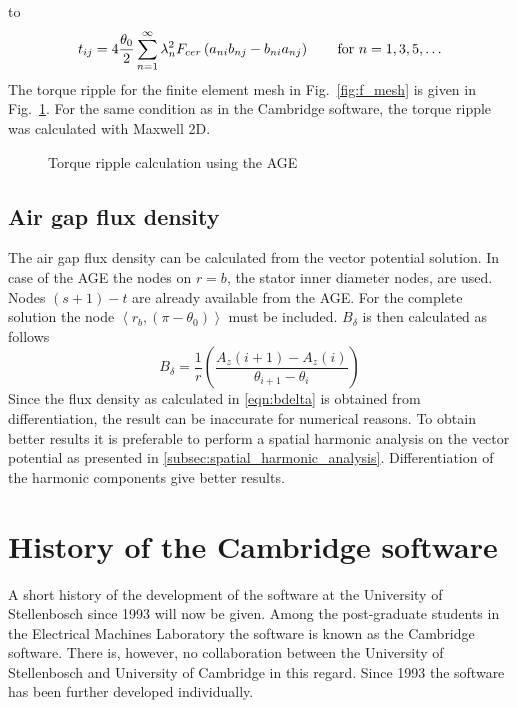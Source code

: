 to
\begin{equation}
  \label{eqn:tij_neg}
  t_{ij}=4\frac{\theta_{0}}{2}\sum^{\infty}_{n=1}\lambda^{2}_{n}
   F_{cer}\left(a_{ni}b_{nj}-b_{ni}a_{nj}\right) \qquad \textnormal{for } n=1,3,5,\ldots
\end{equation}
The torque ripple for the finite element mesh in Fig.~\ref{fig:f_mesh} is given in 
Fig.~\ref{fig:f_age_ss}. For the same condition as in the Cambridge software, the torque ripple was 
calculated with Maxwell 2D. 
\begin{figure}
    \centering
    
    \caption{Torque ripple calculation using the AGE}
    \label{fig:f_age_ss}
\end{figure}


\subsection{Air gap flux density}\label{subsec:air_gap_flux_density}
The air gap flux density can be calculated from the vector potential solution. In case of the AGE the 
nodes on $r=b$, the stator inner diameter nodes, are used. Nodes $(s+1)-t$ are already available from 
the AGE. For the complete solution the node $\left\langle r_{b},(\pi-\theta_{0})\right\rangle$ must 
be included. $B_{\delta}$ is then calculated as follows
\begin{equation}\label{eqn:bdelta}
    B_{\delta}=\frac{1}{r}
    \left(
        \frac{A_{z}(i+1)-A_{z}(i)}{\theta_{i+1}-\theta_{i}}
    \right)  
\end{equation}
Since the flux density as calculated in \eqref{eqn:bdelta} is obtained from differentiation, the 
result can be inaccurate for numerical reasons. To obtain better results it is preferable to perform 
a spatial harmonic analysis on the vector potential as presented in 
\ref{subsec:spatial_harmonic_analysis}. Differentiation of the harmonic components give better results.

\section{History of the Cambridge software}\label{sec:cambridge}
A short history of the development of the software at the University of Stellenbosch since 1993 will 
now be given. Among the post-graduate students in the Electrical Machines Laboratory the software is 
known as the Cambridge software. There is, however, no collaboration between the University of 
Stellenbosch and University of Cambridge in this regard. Since 1993 the software has been further 
developed individually.  


